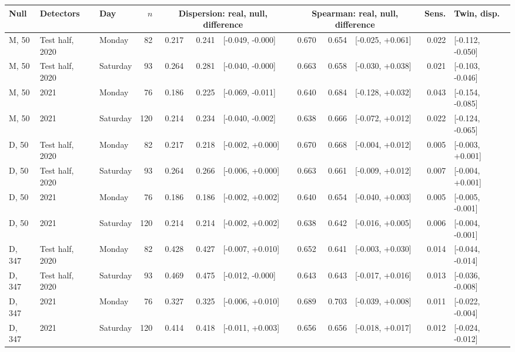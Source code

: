 \begin{tabular}{@{}lllrrrlrrlrl@{}}\toprule
Null & Detectors & Day & $n$ & \multicolumn{3}{c}{Dispersion: real, null, difference} & \multicolumn{3}{c}{Spearman: real, null, difference} & Sens. & Twin, disp. \\\midrule
M, 50 & Test half, 2020 & Monday & 82 & 0.217 & 0.241 & [-0.049, -0.000] & 0.670 & 0.654 & [-0.025, +0.061] & 0.022 & [-0.112, -0.050] \\
M, 50 & Test half, 2020 & Saturday & 93 & 0.264 & 0.281 & [-0.040, -0.000] & 0.663 & 0.658 & [-0.030, +0.038] & 0.021 & [-0.103, -0.046] \\
M, 50 & 2021 & Monday & 76 & 0.186 & 0.225 & [-0.069, -0.011] & 0.640 & 0.684 & [-0.128, +0.032] & 0.043 & [-0.154, -0.085] \\
M, 50 & 2021 & Saturday & 120 & 0.214 & 0.234 & [-0.040, -0.002] & 0.638 & 0.666 & [-0.072, +0.012] & 0.022 & [-0.124, -0.065] \\
D, 50 & Test half, 2020 & Monday & 82 & 0.217 & 0.218 & [-0.002, +0.000] & 0.670 & 0.668 & [-0.004, +0.012] & 0.005 & [-0.003, +0.001] \\
D, 50 & Test half, 2020 & Saturday & 93 & 0.264 & 0.266 & [-0.006, +0.000] & 0.663 & 0.661 & [-0.009, +0.012] & 0.007 & [-0.004, +0.001] \\
D, 50 & 2021 & Monday & 76 & 0.186 & 0.186 & [-0.002, +0.002] & 0.640 & 0.654 & [-0.040, +0.003] & 0.005 & [-0.005, -0.001] \\
D, 50 & 2021 & Saturday & 120 & 0.214 & 0.214 & [-0.002, +0.002] & 0.638 & 0.642 & [-0.016, +0.005] & 0.006 & [-0.004, -0.001] \\
D, 347 & Test half, 2020 & Monday & 82 & 0.428 & 0.427 & [-0.007, +0.010] & 0.652 & 0.641 & [-0.003, +0.030] & 0.014 & [-0.044, -0.014] \\
D, 347 & Test half, 2020 & Saturday & 93 & 0.469 & 0.475 & [-0.012, -0.000] & 0.643 & 0.643 & [-0.017, +0.016] & 0.013 & [-0.036, -0.008] \\
D, 347 & 2021 & Monday & 76 & 0.327 & 0.325 & [-0.006, +0.010] & 0.689 & 0.703 & [-0.039, +0.008] & 0.011 & [-0.022, -0.004] \\
D, 347 & 2021 & Saturday & 120 & 0.414 & 0.418 & [-0.011, +0.003] & 0.656 & 0.656 & [-0.018, +0.017] & 0.012 & [-0.024, -0.012] \\
\bottomrule\end{tabular}
